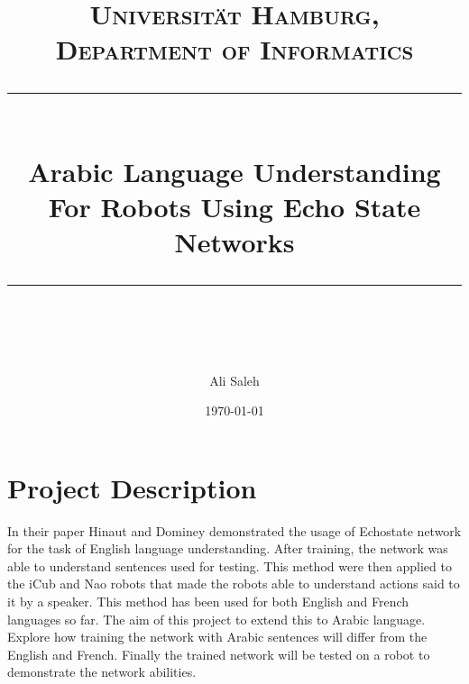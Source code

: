 \documentclass[paper=a4, fontsize=11pt]{scrartcl} %
\numberwithin{equation}{section} %
\numberwithin{figure}{section} %
\numberwithin{table}{section} %
\begin{document}
\newcommand{\horrule}[1]{\rule{\linewidth}{#1}} %

\title{	
\normalfont \normalsize 
\textsc{Universit\"{a}t Hamburg, Department of Informatics} \\ [25pt] %
\horrule{0.5pt} \\[0.4cm] %
\huge Arabic Language Understanding For Robots Using Echo State Networks \\ %
\horrule{2pt} \\[0.5cm] %
}

\author{Ali Saleh} %

\date{\normalsize\today} %


\maketitle %


\section{Project Description}
In their paper \cite{Hinaut2013} Hinaut and Dominey demonstrated the usage of Echostate network for the task of English language understanding. After training, the network was able to understand sentences used for testing. This method were then applied to the iCub and Nao robots that made the robots able to understand actions said to it by a speaker. This method has been used for both English and French languages so far. The aim of this project to extend this to Arabic language. Explore how training the network with Arabic sentences will differ from the English and French. Finally the trained network will be tested on a robot to demonstrate the network abilities.
\end{document}
